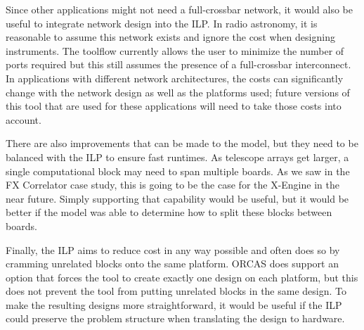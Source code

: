 Since other applications might not need a full-crossbar network, it would also be useful to integrate network design into the ILP.
In radio astronomy, it is reasonable to assume this network exists and ignore the cost when designing instruments.
The toolflow currently allows the user to minimize the number of ports required but this still assumes the presence of a full-crossbar interconnect.
In applications with different network architectures, the costs can significantly change with the network design as well as the platforms used; future versions of this tool that are used for these applications will need to take those costs into account.


There are also improvements that can be made to the model, but they need to be balanced with the ILP to ensure fast runtimes.
As telescope arrays get larger, a single computational block may need to span multiple boards.
As we saw in the FX Correlator case study, this is going to be the case for the X-Engine in the near future.
Simply supporting that capability would be useful, but it would be better if the model was able to determine how to split these blocks between boards.

Finally, the ILP aims to reduce cost in any way possible and often does so by cramming unrelated blocks onto the same platform.
ORCAS does support an option that forces the tool to create exactly one design on each platform, but this does not prevent the tool from putting unrelated blocks in the same design.
To make the resulting designs more straightforward, it would be useful if the ILP could preserve the problem structure when translating the design to hardware.


%
%
